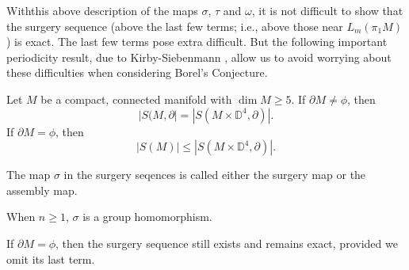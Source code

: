 With\pageoriginale this above description of the maps $\sigma$, $\tau$ and $\omega$,
it is not difficult to show that the surgery sequence (above the last
few terms; i.e., above those near $L_m(\pi_1 M)$) is exact. The last
few terms pose extra difficult. But the following important
periodicity result, due to Kirby-Siebenmann \cite{67}, allow us to
avoid worrying about these difficulties when considering Borel's
Conjecture.

\begin{thm}\label{c5:thm5.2}
  Let $M$ be a compact, connected manifold with $\dim M \geq 5$. If
  $\partial M \neq \phi$, then 
  $$
  |S (M , \partial|= |S(M \times \mathbb{D}^4, \partial)|.
  $$
  If $\partial M = \phi$, then
  $$
  |S (M)| \leq |S(M \times \mathbb{D}^4, \partial)|.
  $$
\end{thm}

\begin{defi}\label{c5:defi5.3}
  The map $\sigma$ in the surgery seqences is called either the
  surgery map or the assembly map.
\end{defi}

\setcounter{remark}{0}
\begin{remark}
  When $n \geq 1$, $\sigma$ is a group homomorphism.
\end{remark}

\begin{remark}
  If $\partial M= \phi$, then the surgery sequence still exists and
  remains exact, provided we omit its last term.
\end{remark}
